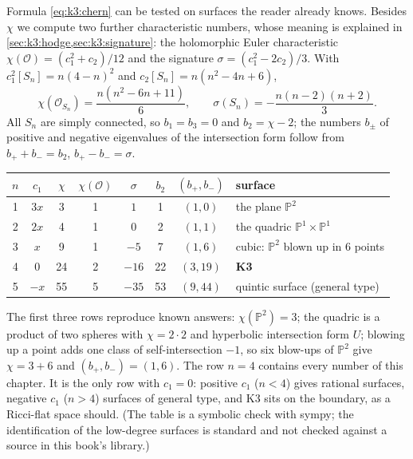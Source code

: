 \begin{example}\label{ex:k3:degrees}
Formula \eqref{eq:k3:chern} can be tested on surfaces the reader already knows. Besides $\chi$
we compute two further characteristic numbers, whose meaning is explained in
\cref{sec:k3:hodge,sec:k3:signature}: the holomorphic Euler characteristic
$\chi(\mathcal{O})=(c_1^2+c_2)/12$ and the signature $\sigma=(c_1^2-2c_2)/3$. With
$c_1^2[S_n]=n(4-n)^2$ and $c_2[S_n]=n(n^2-4n+6)$,
\begin{equation}\label{eq:k3:degreeformulas}
  \chi(\mathcal{O}_{S_n})=\frac{n(n^2-6n+11)}{6},\qquad
  \sigma(S_n)=-\frac{n(n-2)(n+2)}{3}.
\end{equation}
All $S_n$ are simply connected, so $b_1=b_3=0$ and $b_2=\chi-2$; the numbers $b_\pm$ of
positive and negative eigenvalues of the intersection form follow from $b_++b_-=b_2$,
$b_+-b_-=\sigma$.
\begin{center}
\begin{tabular}{@{}cccccccl@{}}
\toprule
$n$ & $c_1$ & $\chi$ & $\chi(\mathcal{O})$ & $\sigma$ & $b_2$ & $(b_+,b_-)$ & surface\\
\midrule
1 & $3x$ & 3 & 1 & $1$ & 1 & $(1,0)$ & the plane $\mathbb{P}^2$\\
2 & $2x$ & 4 & 1 & $0$ & 2 & $(1,1)$ & the quadric $\mathbb{P}^1\times\mathbb{P}^1$\\
3 & $x$ & 9 & 1 & $-5$ & 7 & $(1,6)$ & cubic: $\mathbb{P}^2$ blown up in 6 points\\
4 & $0$ & 24 & 2 & $-16$ & 22 & $(3,19)$ & \textbf{K3}\\
5 & $-x$ & 55 & 5 & $-35$ & 53 & $(9,44)$ & quintic surface (general type)\\
\bottomrule
\end{tabular}
\end{center}
The first three rows reproduce known answers: $\chi(\mathbb{P}^2)=3$; the quadric is a product
of two spheres with $\chi=2\cdot2$ and hyperbolic intersection form $U$; blowing up a point
adds one class of self-intersection $-1$, so six blow-ups of $\mathbb{P}^2$ give $\chi=3+6$ and
$(b_+,b_-)=(1,6)$. The row $n=4$ contains every number of this chapter. It is the only row with
$c_1=0$: positive $c_1$ ($n<4$) gives rational surfaces, negative $c_1$ ($n>4$) surfaces of
general type, and K3 sits on the boundary, as a Ricci-flat space should. (The table is a symbolic check with sympy; the identification of the low-degree surfaces is
standard and not checked against a source in this book's library.)
\end{example}

